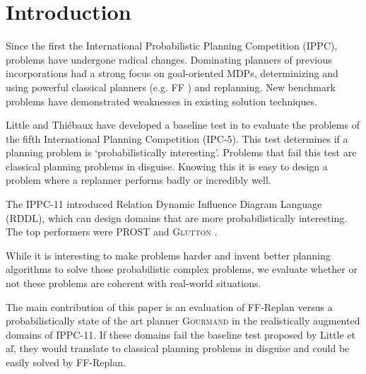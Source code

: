 \documentclass[runningheads,a4paper]{llncs}
\begin{document}

\section{Introduction}

Since the first the International Probabilistic Planning Competition (IPPC),
problems have undergone radical changes. Dominating planners of previous
incorporations had a strong focus on goal-oriented MDPs, determinizing and
using powerful classical planners (e.g. FF \cite{Hoffmann01theff}) and
replanning. New benchmark problems have demonstrated weaknesses in existing
solution techniques.

Little and Thi\'ebaux have developed a baseline test in
\cite{little2007probvsreplan} to evaluate the problems of the fifth International
Planning Competition (IPC-5). This test determines if a planning problem is
`probabilistically interesting'. Problems that fail this test are classical
planning problems in disguise. Knowing this it is easy to design a problem
where a replanner performs badly or incredibly well.

The IPPC-11 introduced Relation Dynamic Influence Diagram Language (RDDL),
which can design domains that are more probabilistically interesting. The top
performers were PROST \cite{keller2012prost} and \textsc{Glutton}
\cite{kolobov2012glutton}.

While it is interesting to make problems harder and invent better planning
algorithms to solve those probabilistic complex problems, we evaluate whether
or not these problems are coherent with real-world situations.

The main contribution of this paper is an evaluation of FF-Replan versus a
probabilistically state of the art planner \textsc{Gourmand} in the realistically
augmented domains of IPPC-11. If these domains fail the baseline test proposed
by Little et al\., they would translate to classical planning problems in
disguise and could be easily solved by FF-Replan.

\end{document}
